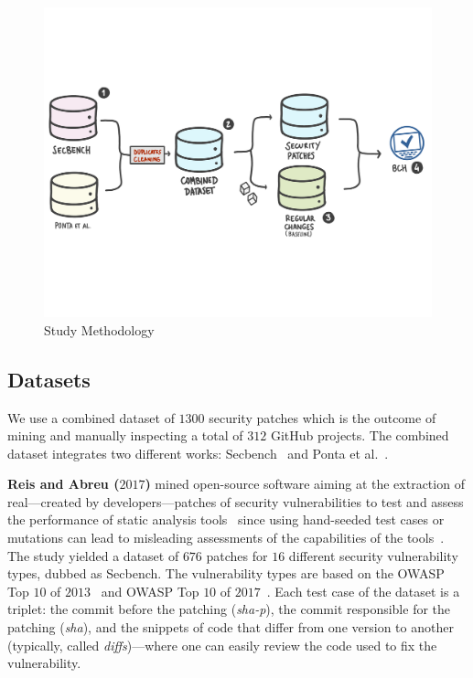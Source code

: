 \documentclass[smallextended]{svjour3}       %
\begin{document}
\begin{figure}[h]
	\centering 	
    \begin{adjustwidth}{-0.5cm}{-0.5cm}  
      \vspace{-2.5cm} 
	\includegraphics[width=1.1\textwidth]{figures/methodology.pdf}
  \vspace{-3cm} 
  \caption{Study Methodology}
	\label{fig:met}
	 \end{adjustwidth}
\end{figure}
%
\subsection{Datasets}
%

We use a combined dataset of $1300$ security patches which is 
the outcome of mining and manually inspecting a total of $312$ 
GitHub projects. The combined dataset integrates two different
works: Secbench~\cite{reis2017secbench,Reis:2017:IJSSE} and Ponta et al.~\cite{10.1109/MSR.2019.00064}.

\textbf{Reis and Abreu 
($2017$)} mined open-source software aiming at the extraction of 
real---created by developers---patches of security vulnerabilities 
to test and assess the performance of static analysis 
tools~\cite{reis2017secbench,Reis:2017:IJSSE} since using hand-seeded test cases or 
mutations can lead to misleading assessments of the capabilities of 
the tools~\cite{just2014mutants}. The study yielded a dataset of 
$676$ patches for $16$ different security vulnerability types, dubbed as Secbench. 
The vulnerability types are based on the OWASP Top $10$ of 
$2013$~\cite{oswap:2013} and OWASP Top $10$ of 
$2017$~\cite{oswap:2017}. Each test case of the dataset is a 
triplet: the commit before the patching (\emph{sha-p}), the commit responsible
for the patching (\emph{sha}), and the snippets of code that differ from one 
version to another (typically, called \emph{diffs})---where one 
can easily review the code used to fix the vulnerability. 
\end{document}
